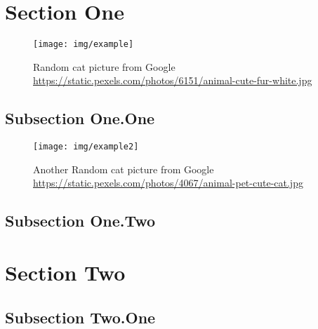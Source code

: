 
\section{Section One}
\lipsum[1-2]

\begin{figure}[h]
  \centering
  \texttt{[image: img/example]}
  \caption{Random cat picture from Google \protect\url{https://static.pexels.com/photos/6151/animal-cute-fur-white.jpg}}
  \label{img:cat1}
\end{figure}

\lipsum[3-4]

\subsection{Subsection One.One}
\lipsum[5]

\begin{figure*}[ht]
  \centering
  \texttt{[image: img/example2]}
  \caption{Another Random cat picture from Google \protect\url{https://static.pexels.com/photos/4067/animal-pet-cute-cat.jpg}}
  \label{img:cat2}
\end{figure*}

\subsection{Subsection One.Two}
\lipsum[6-7]

\section{Section Two}
\lipsum[9-12]

\subsection{Subsection Two.One}
\lipsum[13-15]
